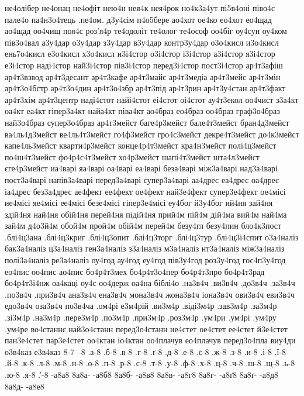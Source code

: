 {не4олібер
не4онац
не4офіт
нею4н
нея4к
нея4рок
но4к3а4ут
пі5в4оні
піво4с
пале4о
па4н3о4тець
.пе4ом.
д3у4сім
п4о5бере
ао4хот
ое4ко
ео4хот
ео4щад
ао4щад
оо4чищ
поя4с
роз'я4р
те4одоліт
те4олог
те4ософ
оо4біг
оу4сун
оу4ком
пів3о4вал
а3у4дар
о3у4дар
з3у4дар
в3у4дар
контр3у4дар
о3о4кисл
и3о4кисл
ень7о4кисл
е3о4кисл
х3о4кисл
и3і4стор
о3і4стор
і3і4стор
а3і4стор
я3і4стор
е3і4стор
наді4стор
най3і4стор
пів3і4стор
перед3і4стор
пост3і4стор
ар4т3афіш
ар4т3взвод
ар4т3десант
ар4т3кафе
ар4т3майс
ар4т3медіа
ар4т3мейс
ар4т3мін
ар4т3о4бстр
ар4т3о4дин
ар4т3о4збр
ар4т3під
ар4т3рин
ар4т3у4стан
ар4т3факт
ар4т3хім
ар4т3центр
наді4стот
найі4стот
еі4стот
оі4стот
ау4т3екол
оо4чист
з3а4кт
оа4кт
еа4кт
гіпер3а4кт
найа4кт
піва4кт
ао4браз
ео4браз
оо4браз
граф3о4браз
най3о4браз
супер3о4браз
ар4т3мейст
баге4р3мейст
бале4т3мейст
бран4д3мейст
ва4ль4д3мейст
ве4ль4т3мейст
го4ф3мейст
гро4с3мейст
декре4т3мейст
до4к3мейст
капе4ль3мейст
кварти4р3мейст
конце4р4т3мейст
кра4н3мейст
полі4ц3мейст
по4ш4т3мейст
фо4р4с4т3мейст
хо4р3мейст
шапі4т3мейст
шта4л3мейст
єге4р3мейст
иа4варі
яа4варі
оа4варі
еа4варі
беза4варі
між3а4варі
над3а4варі
пост3а4варі
напів3а4варі
перед3а4варі
супер3а4варі
аа4дрес
еа4дрес
оа4дрес
іа4дрес
без3а4дрес
ае4фект
ее4фект
ое4фект
най3е4фект
супер3е4фект
ое4місі
ие4місі
яе4місі
ее4місі
безе4місі
гіпер3е4місі
еу4бог
й3у4бог
ий4ня
зай4ня
здій4ня
най4ня
обій4ня
перей4ня
підій4ня
прий4м
пій4м
дій4ма
вий4м
най4ма
зай4м
д4о3й4м
обой4м
прой4м
обій4м
перей4м
безу4гл
безу4пин
бло4к3пост
.блі4ц3ана
.блі4ц3криг
.блі4ц3опит
.блі4ц3торг
.блі4ц3тур
.блі4ц3і4спит
о3а4наліз
бак3а4наліз
ц3а4наліз
ген3а4наліз
з3а4наліз
м3а4наліз
нт3а4наліз
між3а4наліз
полі3а4наліз
ре3а4наліз
оу4год
ау4год
еу4год
пів3у4год
роз3у4год
гос4п3у4год
ео4пис
оо4пис
ао4пис
бо4р4т3мех
бо4р4т3о4пер
бо4р4т3про
бо4р4т3рад
бо4р4т3і4нж
оа4каці
оу4с
оо4держ
оа4на
біблі4о
.на3в4ч
.ви3в4ч
.до3в4ч
.за3в4ч
.по3в4ч
.при3в4ч
ана3в4ч
ена3в4ч
мона3в4ч
жона3в4ч
іона3в4ч
ови3в4ч
еви3в4ч
едо3в4ч
оза3в4ч
по3в4ча
.ом4рі
е3м4рій
.ви3м4р
.віді3м4р
.зав3м4р
.за3м4р
.зі3м4р
.на3м4р
.пере3м4р
.по3м4р
.при3м4р
.роз3м4р
.ум4ри
.ум4рі
.ум4ру
.ум4ре
во4станнє
най3о4станн
перед3о4станн
ие4стет
ое4стет
ее4стет
й3е4стет
пан3е4стет
пар3е4стет
оо4ктан
іо4ктан
оо4плачув
ео4плачув
перед3о4пла
виу4ди
о3в4каз
е3в4каз
8-7
--8
.а-8
.б-8
.в-8
.г-8
.ґ-8
.д-8
.е-8
.є-8
.ж-8
.з-8
.и-8
.і-8
.ї-8
.й-8
.к-8
.л-8
.м-8
.н-8
.о-8
.п-8
.р-8
.с-8
.т-8
.у-8
.ф-8
.х-8
.ц-8
.ч-8
.ш-8
.щ-8
.ь-8
.ю-8
.я-8
.'-8
-а8а8
8а8а-
-а8б8
8а8б-
-а8в8
8а8в-
-а8г8
8а8г-
-а8ґ8
8а8ґ-
-а8д8
8а8д-
-а8е8
}
